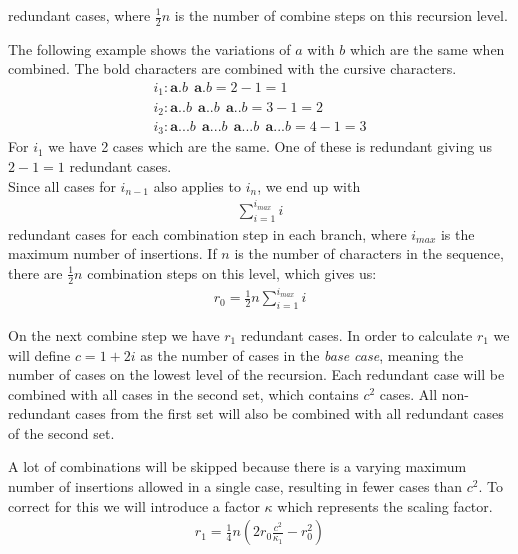 \documentclass[12pt]{article}
\theoremstyle{definition}
\begin{document}
redundant cases, where $\frac{1}{2}n$ is the number of combine steps on this recursion level.

\begin{example}
The following example shows the variations of $a$ with $b$ which are the same when combined. The bold characters are combined with the cursive characters.
\begin{eqnarray}
	i_{1}: \textbf{a.}b\ \ \textbf{a}.b = 2 - 1 = 1 \\
	i_{2}: \textbf{a..}b\ \ \textbf{a.}.b\ \ \textbf{a}..b = 3 - 1 = 2 \\
	i_{3}: \textbf{a...}b\ \ \textbf{a..}.b\ \ \textbf{a.}..b\ \ \textbf{a}...b = 4 - 1 = 3
\end{eqnarray}
For $i_{1}$ we have 2 cases which are the same. One of these is redundant giving us $2 - 1 = 1$ redundant cases. \\
Since all cases for $i_{n-1}$ also applies to $i_{n}$, we end up with
\begin{eqnarray}
	\sum_{i=1}^{i_{max}}i
\end{eqnarray}
redundant cases for each combination step in each branch, where $i_{max}$ is the maximum number of insertions. If $n$ is the number of characters in the sequence, there are $\frac{1}{2}n$ combination steps on this level, which gives us:
\begin{eqnarray}
	r_0 = \frac{1}{2}n\sum^{i_{max}}_{i=1} i
\end{eqnarray}
\end{example}

On the next combine step we have $r_1$ redundant cases. In order to calculate $r_1$ we will define $c = 1 + 2i$ as the number of cases in the \textit{base case}, meaning the number of cases on the lowest level of the recursion. Each redundant case will be combined with all cases in the second set, which contains $c^2$ cases. All non-redundant cases from the first set will also be combined with all redundant cases of the second set. 

A lot of combinations will be skipped because there is a varying maximum number of insertions allowed in a single case, resulting in fewer cases than $c^2$. To correct for this we will introduce a factor $\kappa$ which represents the scaling factor.
\begin{eqnarray}
	\label{r_1}
	r_1 = \frac{1}{4}n(2r_0\frac{c^2}{\kappa_1} - r_0^2)
\end{eqnarray}
\end{document}
